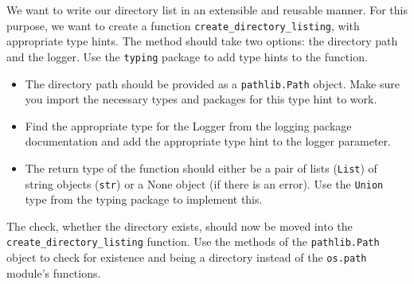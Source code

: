 \documentclass[]{erlangen-problemset}
\begin{document}
\begin{problem}[title={Type checking}]
\noindent
We want to write our directory list in an extensible and reusable manner. 
For this purpose, we want to create a function \texttt{create\_directory\_listing}, with appropriate type hints.
\Question The method should take two options: the directory path and the logger.
\Question Use the \texttt{typing} package to add type hints to the function. 
\begin{itemize}
	\item The directory path should be provided as a \texttt{pathlib.Path} object. 
	Make sure you import the necessary types and packages for this type hint to work.
	\item Find the appropriate type for the Logger from the logging package documentation and add the appropriate type hint to the logger parameter.
	\item The return type of the function should either be a pair of lists (\texttt{List}) of string objects (\texttt{str}) or a None object (if there is an error). 
	Use the \texttt{Union} type from the typing package to implement this.
\end{itemize}
\Question The check, whether the directory exists, should now be moved into the \texttt{create\_directory\_listing} function.
Use the methods of the \texttt{pathlib.Path} object to check for existence and being a directory instead of the \texttt{os.path} module's functions.


\end{problem}
\end{document}
